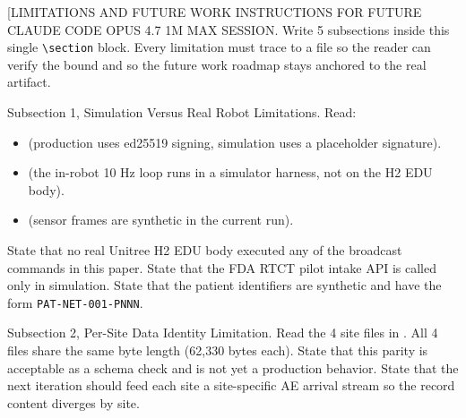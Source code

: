 %
%

\begin{sectionaccent}

[LIMITATIONS AND FUTURE WORK INSTRUCTIONS FOR FUTURE CLAUDE CODE OPUS
4.7 1M MAX SESSION. Write 5 subsections inside this single
\texttt{\textbackslash section} block. Every limitation must trace to a
file so the reader can verify the bound and so the future work
roadmap stays anchored to the real artifact.

Subsection 1, Simulation Versus Real Robot Limitations. Read:
\begin{itemize}
  \item {}
        (production uses ed25519 signing, simulation uses a placeholder
        signature).
  \item {}
        (the in-robot 10 Hz loop runs in a simulator harness, not on
        the H2 EDU body).
  \item {}
        (sensor frames are synthetic in the current run).
\end{itemize}
State that no real Unitree H2 EDU body executed any of the broadcast
commands in this paper. State that the FDA RTCT pilot intake API is
called only in simulation. State that the patient identifiers are
synthetic and have the form \texttt{PAT-NET-001-PNNN}.

Subsection 2, Per-Site Data Identity Limitation. Read the 4 site
files in
.
All 4 files share the same byte length (62,330 bytes each). State
that this parity is acceptable as a schema check and is not yet a
production behavior. State that the next iteration should feed each
site a site-specific AE arrival stream so the record content
diverges by site.


\end{sectionaccent}
